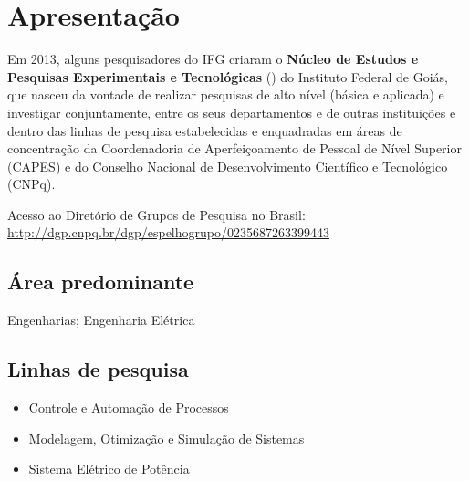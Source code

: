 \documentclass{manualmarca}
\begin{document}
\maketitle{}
\InicioDocumento{}
\section*{Apresentação}
\label{sec:apresentacao}

Em 2013, alguns pesquisadores do IFG criaram o \textbf{Núcleo de Estudos e
  Pesquisas Experimentais e Tecnológicas} (\NExT{}) do Instituto Federal de
Goiás, que nasceu da vontade de realizar pesquisas de alto nível (básica e
aplicada) e investigar conjuntamente, entre os seus departamentos e de outras
instituições e dentro das linhas de pesquisa estabelecidas e enquadradas em
áreas de concentração da Coordenadoria de Aperfeiçoamento de Pessoal de Nível
Superior (CAPES) e do Conselho Nacional de Desenvolvimento Científico e
Tecnológico (CNPq).

  \vspace*{1cm}
  Acesso ao Diretório de Grupos de Pesquisa no Brasil:\\ \url{http://dgp.cnpq.br/dgp/espelhogrupo/0235687263399443}

  \subsection*{Área predominante}
  Engenharias; Engenharia Elétrica

  \subsection*{Linhas de pesquisa}

  \begin{itemize}
  \item Controle e Automação de Processos
  \item Modelagem, Otimização e Simulação de Sistemas
  \item Sistema Elétrico de Potência
  \end{itemize}
\end{document}
